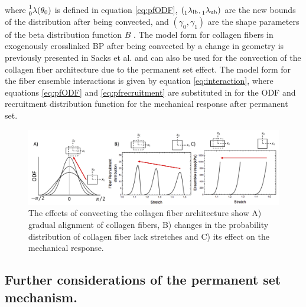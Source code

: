 where $\prescript{1}{0}{\lambda(\theta_0)}$ is defined in equation \ref{eq:pfODF}, $(\prescript{}{1}{\lambda}_\mathrm{lb},\prescript{}{1}{\lambda}_\mathrm{ub})$ are the new bounds of the distribution after being convected, and $(\gamma_0,\gamma_1)$ are the shape parameters of the beta distribution function $B$ .
The model form for collagen fibers in exogenously crosslinked BP after being convected by a change in geometry is previously presented in Sacks et al. \cite{sacks_novel_2015} and can also be used for the convection of the collagen fiber architecture due to the permanent set effect. 
The model form for the fiber ensemble interactions is given by equation \ref{eq:interaction}, where equations \ref{eq:pfODF} and \ref{eq:pfrecruitment} are substituted in for the ODF and recruitment distribution function for the mechanical response after permanent set.


\begin{figure}[hbt]
\centering
\centerline{\includegraphics[width=\textwidth]{Images/chapter4/figure10}}
\caption{The effects of convecting the collagen fiber architecture show A) gradual alignment of collagen fibers, B) changes in the probability distribution of collagen fiber lack stretches and C) its effect on the mechanical response.}
\label{fig:effectsofconvection}
\end{figure}




\subsection{Further considerations of the permanent set mechanism.}

